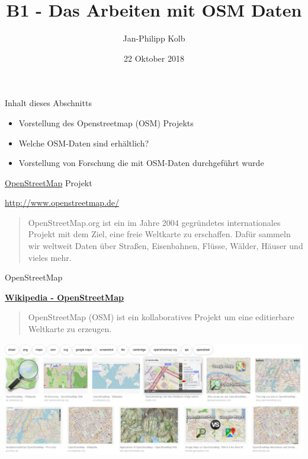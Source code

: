 \documentclass[ignorenonframetext,]{beamer}
\title{B1 - Das Arbeiten mit OSM Daten}
\author{Jan-Philipp Kolb}
\date{22 Oktober 2018}
\providecommand{\tightlist}{%
  \setlength{\itemsep}{0pt}\setlength{\parskip}{0pt}}
\begin{document}
\frame{\titlepage}

\begin{frame}{Inhalt dieses Abschnitts}
\protect\hypertarget{inhalt-dieses-abschnitts}{}

\begin{itemize}
\tightlist
\item
  Vorstellung des Openstreetmap (OSM) Projekts
\item
  Welche OSM-Daten sind erhältlich?
\item
  Vorstellung von Forschung die mit OSM-Daten durchgeführt wurde
\end{itemize}

\end{frame}

\begin{frame}{\href{http://www.openstreetmap.de/}{OpenStreetMap}
Projekt}
\protect\hypertarget{openstreetmap-projekt}{}

\begin{block}{\url{http://www.openstreetmap.de/}}

\begin{quote}
OpenStreetMap.org ist ein im Jahre 2004 gegründetes internationales
Projekt mit dem Ziel, eine freie Weltkarte zu erschaffen. Dafür sammeln
wir weltweit Daten über Straßen, Eisenbahnen, Flüsse, Wälder, Häuser und
vieles mehr.
\end{quote}

\end{block}

\end{frame}

\begin{frame}{OpenStreetMap}
\protect\hypertarget{openstreetmap}{}

\begin{block}{\href{https://en.wikipedia.org/wiki/OpenStreetMap}{\textbf{Wikipedia
- OpenStreetMap}}}

\begin{quote}
OpenStreetMap (OSM) ist ein kollaboratives Projekt um eine editierbare
Weltkarte zu erzeugen.
\end{quote}

\includegraphics{figure/overview_osm.PNG}

\end{block}

\end{frame}
\end{document}
